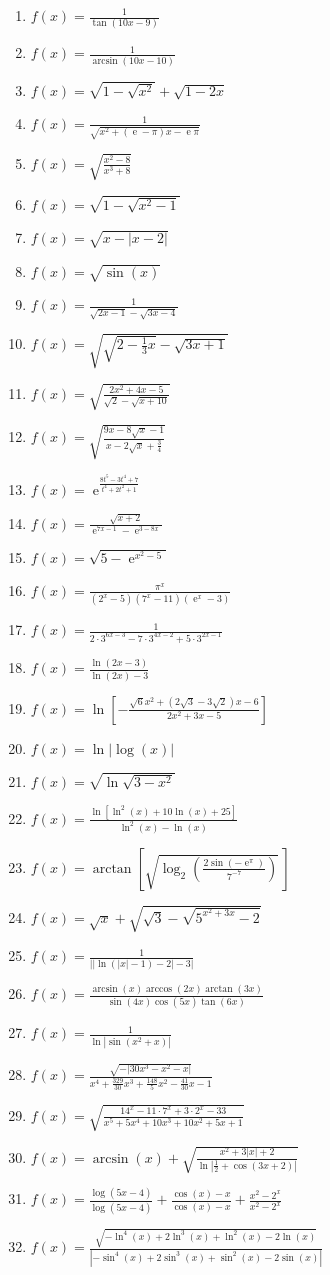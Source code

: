 \documentclass[a4paper,12pt]{article}
\DeclareMathOperator{\e}{e}
\begin{document}
\begin{multicols}{2}
\begin{enumerate}
\item $f(x)=\frac{1}{\tan(10x-9)}$
\item $f(x)=\frac{1}{\arcsin(10x-10)}$
\item $f(x)=\sqrt{1-\sqrt{x^2}}+\sqrt{1-2x}$
\item $f(x)=\frac{1}{\sqrt{x^2+(\e-\pi)x-\e\pi}}$
\item $f(x)=\sqrt{\frac{x^2-8}{x^3+8}}$
\item $f(x)=\sqrt{1-\sqrt{x^2-1}}$
\item $f(x)=\sqrt{x-|x-2|}$
\item $f(x)=\sqrt{\sin(x)}$
\item $f(x)=\frac{1}{\sqrt{2x-1}-\sqrt{3x-4}}$
\item $f(x)=\sqrt{\sqrt{2-\frac{1}{3}x}-\sqrt{3x+1}}$
\item $f(x)=\sqrt{\frac{2x^2+4x-5}{\sqrt{2}-\sqrt{x+10}}}$
\item $f(x)=\sqrt{\frac{9x-8\sqrt{x}-1}{x-2\sqrt{x}+\frac{3}{4}}}$
\item $f(x)=\e^{\frac{8t^5-3t^4+7}{t^4+2t^2+1}}$
\item $f(x)=\frac{\sqrt{x+2}}{\e^{7x-1}-\e^{3-8x}}$
\item $f(x)=\sqrt{5-\e^{x^2-5}}$
\item $f(x)=\frac{\pi^x}{(2^x-5)(7^x-11)(\e^x-3)}$
\item $f(x)=\frac{1}{2\cdot3^{6x-3}-7\cdot3^{4x-2}+5\cdot3^{2x-1}}$ %
\item $f(x)=\frac{\ln(2x-3)}{\ln(2x)-3}$
\item $f(x)=\ln\left\lbrack-\frac{\sqrt{6}x^2+(2\sqrt{3}-3\sqrt{2})x-6}{2x^2+3x-5}\right\rbrack$
\item $f(x)=\ln|\log(x)|$
\item $f(x)=\sqrt{\ln\sqrt{3-x^2}}$
\item $f(x)=\frac{\ln\left\lbrack\ln^2(x)+10\ln(x)+25\right\rbrack}{\ln^2(x)-\ln(x)}$
\item $f(x)=\arctan\left\lbrack\sqrt{\log_{2}\left(\frac{2\sin(-\e^\pi)}{7^{-7}}\right)}\,\right\rbrack$
\item $f(x)=\sqrt{x}+\sqrt{\sqrt{3}-\sqrt{5^{x^2+3x}-2}}$
\item $f(x)=\frac{1}{\left|\left|\ln(|x|-1)-2\right|-3\right|}$
\item $f(x)=\frac{\arcsin(x)\arccos(2x)\arctan(3x)}{\sin(4x)\cos(5x)\tan(6x)}$
\item $f(x)=\frac{1}{\ln\left|\sin(x^2+x)\right|}$
\item $f(x)=\frac{\sqrt{-\left|30x^3-x^2-x\right|}}{x^4+\frac{329}{30}x^3+\frac{148}{5}x^2-\frac{41}{30}x-1}$ %
\item $f(x)=\sqrt{\frac{14^x-11\cdot7^x+3\cdot2^x-33}{x^5+5x^4+10x^3+10x^2+5x+1}}$
\item $f(x)=\arcsin(x)+\sqrt{\frac{x^2+3|x|+2}{\ln\left|\frac{1}{2}+\cos(3x+2)\right|}}$
\item $f(x)=\frac{\log(5x-4)}{\log(5x-4)}+\frac{\cos(x)-x}{\cos(x)-x}+\frac{x^2-2^x}{x^2-2^x}$
\item $f(x)=\frac{\sqrt{-\ln^4(x)+2\ln^3(x)+\ln^2(x)-2\ln(x)}}{\left|-\sin^4(x)+2\sin^3(x)+\sin^2(x)-2\sin(x)\right|}$


\end{enumerate}
\end{multicols}
\end{document}
